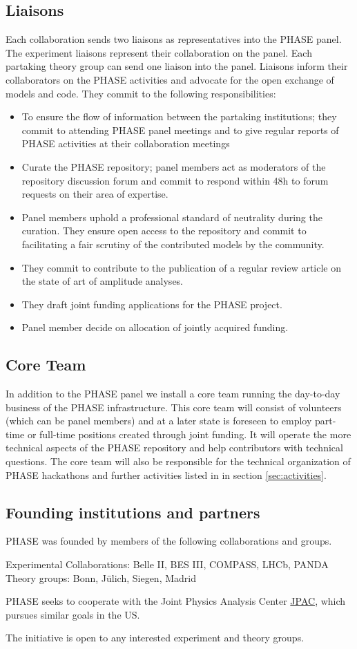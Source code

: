 \subsection{Liaisons}
Each collaboration sends two liaisons as representatives into the PHASE panel. The experiment liaisons represent their collaboration on the panel. Each partaking theory group can send one liaison into the panel. Liaisons inform their collaborators on the PHASE activities and advocate for the open exchange of models and code. They commit to the following responsibilities:
\begin{itemize}
\item To ensure the flow of information between the partaking institutions; they commit to attending PHASE panel meetings and to give regular reports of PHASE activities at their collaboration meetings
\item Curate the PHASE repository; panel members act as moderators of the repository discussion forum and commit to respond within 48h to forum requests on their area of expertise. 
\item Panel members uphold a professional standard of neutrality during the curation. They ensure open access to the repository and commit to facilitating a fair scrutiny of the contributed models by the community. 
\item They commit to contribute to the publication of a regular review article on the state of art of amplitude analyses.
\item They draft joint funding applications for the PHASE project.
\item Panel member decide on allocation of jointly acquired funding.
\end{itemize}

\subsection{Core Team}
In addition to the PHASE panel we install a core team running the day-to-day business of the PHASE infrastructure. This core team will consist of volunteers (which can be panel members) and at a later state is foreseen to employ part-time or full-time positions created through joint funding. It will operate the more technical aspects of the PHASE repository and help contributors with technical questions. The core team will also be responsible for the technical organization of PHASE hackathons and further activities listed in in section \ref{sec:activities}.

\subsection{Founding institutions and partners}
PHASE was founded by members of the following collaborations and groups.

Experimental Collaborations: Belle II, BES III, COMPASS, LHCb, PANDA \\
Theory groups: Bonn, J\"ulich, Siegen, Madrid

PHASE seeks to cooperate with the Joint Physics Analysis Center \href{https://jpac.jlab.org/}{JPAC}, which pursues similar goals in the US.

The initiative is open to any interested experiment and theory groups.